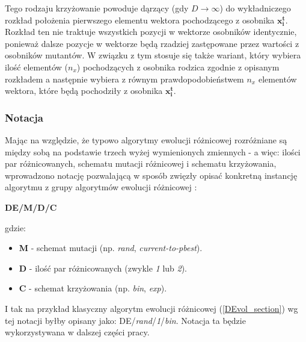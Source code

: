 \documentclass[12pt,a4paper]{report}
\begin{document}
{{{{\begin{description}
Tego rodzaju krzyżowanie powoduje dąrzący (gdy $D \rightarrow \infty$) do wykładniczego rozkład położenia pierwszego elementu wektora pochodzącego z osobnika $\mathbf{x_i^t}$. Rozkład ten nie traktuje wszystkich pozycji w wektorze osobników identycznie, ponieważ dalsze pozycje w wektorze będą rzadziej zastępowane przez wartości z osobników mutantów. W związku z tym stosuje się także wariant, który wybiera ilość elementów ($n_x$) pochodzących z osobnika rodzica zgodnie z opisanym rozkładem a następnie wybiera z równym prawdopodobieństwem $n_x$ elementów wektora, które będą pochodziły z osobnika $\mathbf{x_i^t}$.
\end{description}
}
\subsubsection{Notacja}
\par{
Mając na względzie, że typowo algorytmy ewolucji różnicowej rozróżniane są między sobą na podstawie trzech wyżej wymienionych zmiennych - a więc: ilości par różnicowanych, schematu mutacji różnicowej i schematu krzyżowania, wprowadzono notację pozwalającą w sposób zwięzły opisać konkretną instancję algorytmu z grupy algorytmów ewolucji różnicowej \cite{PracticalInsights}:
\begin{center}
\textbf{DE/M/D/C}
\end{center}
gdzie:
\begin{itemize}
\item \textbf{M} - schemat mutacji (np. \emph{rand}, \emph{current-to-pbest}).
\item \textbf{D} - ilość par różnicowanych (zwykle \emph{1} lub \emph{2}).
\item \textbf{C} - schemat krzyżowania (np. \emph{bin}, \emph{exp}).
\end{itemize}
I tak na przykład klasyczny algorytm ewolucji różnicowej (\ref{DEvol_section}) wg tej notacji byłby opisany jako: DE/\emph{rand}/\emph{1}/\emph{bin}. Notacja ta będzie wykorzystywana w dalszej części pracy.
}


}}}
\end{document}

